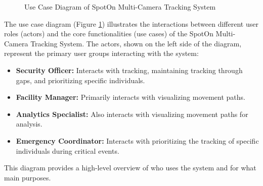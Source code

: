 \begin{figure}[h!]
    \centering
    \caption{Use Case Diagram of SpotOn Multi-Camera Tracking System}
    \label{fig:use-case-diagram}
\end{figure}
\clearpage
The use case diagram (Figure \ref{fig:use-case-diagram}) illustrates the interactions between different user roles (actors) and the core functionalities (use cases) of the SpotOn Multi-Camera Tracking System. The actors, shown on the left side of the diagram, represent the primary user groups interacting with the system:

\begin{itemize}
    \item \textbf{Security Officer:} Interacts with tracking, maintaining tracking through gaps, and prioritizing specific individuals.
    \item \textbf{Facility Manager:} Primarily interacts with visualizing movement paths.
    \item \textbf{Analytics Specialist:} Also interacts with visualizing movement paths for analysis.
    \item \textbf{Emergency Coordinator:} Interacts with prioritizing the tracking of specific individuals during critical events.
\end{itemize}
This diagram provides a high-level overview of who uses the system and for what main purposes.

